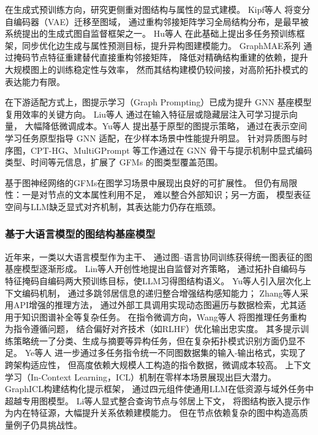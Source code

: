 在生成式预训练方向，研究更侧重对图结构与属性的显式建模。
Kipf等人\cite{Kipf2016VariationalGA} 将变分自编码器（VAE）\cite{Lopez2020DecisionMakingWA}迁移至图域，
通过重构邻接矩阵学习全局结构分布，是最早被系统提出的生成式图自监督框架之一。
Hu等人\cite{Hu2020GPTGNNGP} 在此基础上提出多任务预训练框架，同步优化边生成与属性预测目标，提升异构图建模能力。
GraphMAE系列\cite{Hou2022GraphMAESM} 通过掩码节点特征重建替代直接重构邻接矩阵，
降低对精确结构重建的依赖，提升大规模图上的训练稳定性与效率，
然而其结构建模仍较间接，对高阶拓扑模式的表达能力有限。

在下游适配方式上，图提示学习（Graph Prompting）已成为提升 GNN 基座模型复用效率的关键方向。
Liu等人\cite{Liu2023GraphPromptUP} 通过在输入特征层或隐藏层注入可学习提示向量，
大幅降低微调成本。Yu等人\cite{Yu2024NonHomophilicGP} 提出基于原型的图提示策略，
通过在表示空间学习任务原型指导 GNN 适配，在少样本场景中性能提升明显。
针对异质图与时序图，CPT-HG\cite{Jiang2021ContrastivePO}、MultiGPrompt\cite{Yu2023MultiGPromptFM} 
等工作通过在 GNN 骨干与提示机制中显式编码类型、时间等元信息，扩展了 GFMs 的图类型覆盖范围。

基于图神经网络的GFMs在图学习场景中展现出良好的可扩展性。
但仍有局限性：一是对节点的文本属性利用不足，
难以整合外部知识；另一方面，
模型表征空间与LLM缺乏显式对齐机制，其表达能力仍存在瓶颈。

\subsubsection{基于大语言模型的图结构基座模型}

近年来，一类以大语言模型作为主干、
通过图–语言协同训练获得统一图表征的图基座模型逐渐形成。
Lin等人\cite{Lin2024LangGFMAL}开创性地提出自监督对齐策略，
通过拓扑自编码与特征掩码自编码两大预训练目标，使LLM习得图结构语义。
Yu等人\cite{Yang2024GraphAgentAG}引入层次化上下文编码机制，
通过多跳邻居信息的递归整合增强结构感知能力；
Zhang等人\cite{Zhang2023GraphToolFormerTE}采用API增强的推理方法，
通过外部工具调用实现动态图遍历与数据检索，尤其适用于知识图谱补全等复杂任务。
在指令微调方向，Wang等人\cite{Wang2024InstructGraphBL} 将图推理任务重构为指令遵循问题，
结合偏好对齐技术（如RLHF）优化输出忠实度。
其多提示训练策略统一了分类、生成与摘要等异构任务，但在复杂拓扑模式识别方面仍显不足。
Ye等人\cite{Ye2023LanguageIA} 进一步通过多任务指令统一不同图数据集的输入-输出格式，实现了跨架构适应性，
但高度依赖大规模人工构造的指令数据，微调成本较高。
上下文学习（In-Context Learning，ICL）机制在零样本场景展现出巨大潜力。
GraphICL\cite{Sun2025GraphICLUG}构建结构化提示框架，
通过四元组件使通用LLM在低资源与域外任务中超越专用图模型。
Li等人\cite{Li2025AreLL}显式整合查询节点与邻居上下文，
将图结构嵌入提示作为内在特征源，大幅提升关系依赖建模能力。
但在节点依赖复杂的图中构造高质量例子仍具挑战性。

